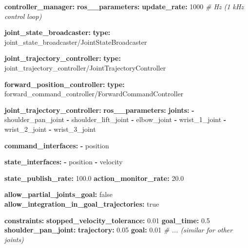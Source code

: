 \documentclass[
]{article}
\newenvironment{Shaded}{\begin{snugshade}}{\end{snugshade}}
\newcommand{\AttributeTok}[1]{\textcolor[rgb]{0.13,0.29,0.53}{#1}}
\newcommand{\CharTok}[1]{\textcolor[rgb]{0.31,0.60,0.02}{#1}}
\newcommand{\CommentTok}[1]{\textcolor[rgb]{0.56,0.35,0.01}{\textit{#1}}}
\newcommand{\DecValTok}[1]{\textcolor[rgb]{0.00,0.00,0.81}{#1}}
\newcommand{\FloatTok}[1]{\textcolor[rgb]{0.00,0.00,0.81}{#1}}
\newcommand{\FunctionTok}[1]{\textcolor[rgb]{0.13,0.29,0.53}{\textbf{#1}}}
\newcommand{\KeywordTok}[1]{\textcolor[rgb]{0.13,0.29,0.53}{\textbf{#1}}}
\begin{document}
\begin{Shaded}
\begin{Highlighting}[]
\FunctionTok{controller\_manager}\KeywordTok{:}
\AttributeTok{  }\FunctionTok{ros\_\_parameters}\KeywordTok{:}
\AttributeTok{    }\FunctionTok{update\_rate}\KeywordTok{:}\AttributeTok{ }\DecValTok{1000}\CommentTok{  \# Hz (1 kHz control loop)}

\AttributeTok{    }\FunctionTok{joint\_state\_broadcaster}\KeywordTok{:}
\AttributeTok{      }\FunctionTok{type}\KeywordTok{:}\AttributeTok{ joint\_state\_broadcaster/JointStateBroadcaster}

\AttributeTok{    }\FunctionTok{joint\_trajectory\_controller}\KeywordTok{:}
\AttributeTok{      }\FunctionTok{type}\KeywordTok{:}\AttributeTok{ joint\_trajectory\_controller/JointTrajectoryController}

\AttributeTok{    }\FunctionTok{forward\_position\_controller}\KeywordTok{:}
\AttributeTok{      }\FunctionTok{type}\KeywordTok{:}\AttributeTok{ forward\_command\_controller/ForwardCommandController}

\FunctionTok{joint\_trajectory\_controller}\KeywordTok{:}
\AttributeTok{  }\FunctionTok{ros\_\_parameters}\KeywordTok{:}
\AttributeTok{    }\FunctionTok{joints}\KeywordTok{:}
\AttributeTok{      }\KeywordTok{{-}}\AttributeTok{ shoulder\_pan\_joint}
\AttributeTok{      }\KeywordTok{{-}}\AttributeTok{ shoulder\_lift\_joint}
\AttributeTok{      }\KeywordTok{{-}}\AttributeTok{ elbow\_joint}
\AttributeTok{      }\KeywordTok{{-}}\AttributeTok{ wrist\_1\_joint}
\AttributeTok{      }\KeywordTok{{-}}\AttributeTok{ wrist\_2\_joint}
\AttributeTok{      }\KeywordTok{{-}}\AttributeTok{ wrist\_3\_joint}

\AttributeTok{    }\FunctionTok{command\_interfaces}\KeywordTok{:}
\AttributeTok{      }\KeywordTok{{-}}\AttributeTok{ position}

\AttributeTok{    }\FunctionTok{state\_interfaces}\KeywordTok{:}
\AttributeTok{      }\KeywordTok{{-}}\AttributeTok{ position}
\AttributeTok{      }\KeywordTok{{-}}\AttributeTok{ velocity}

\AttributeTok{    }\FunctionTok{state\_publish\_rate}\KeywordTok{:}\AttributeTok{ }\FloatTok{100.0}
\AttributeTok{    }\FunctionTok{action\_monitor\_rate}\KeywordTok{:}\AttributeTok{ }\FloatTok{20.0}

\AttributeTok{    }\FunctionTok{allow\_partial\_joints\_goal}\KeywordTok{:}\AttributeTok{ }\CharTok{false}
\AttributeTok{    }\FunctionTok{allow\_integration\_in\_goal\_trajectories}\KeywordTok{:}\AttributeTok{ }\CharTok{true}

\AttributeTok{    }\FunctionTok{constraints}\KeywordTok{:}
\AttributeTok{      }\FunctionTok{stopped\_velocity\_tolerance}\KeywordTok{:}\AttributeTok{ }\FloatTok{0.01}
\AttributeTok{      }\FunctionTok{goal\_time}\KeywordTok{:}\AttributeTok{ }\FloatTok{0.5}
\AttributeTok{      }\FunctionTok{shoulder\_pan\_joint}\KeywordTok{:}
\AttributeTok{        }\FunctionTok{trajectory}\KeywordTok{:}\AttributeTok{ }\FloatTok{0.05}
\AttributeTok{        }\FunctionTok{goal}\KeywordTok{:}\AttributeTok{ }\FloatTok{0.01}
\CommentTok{      \# ... (similar for other joints)}
\end{Highlighting}
\end{Shaded}
\end{document}
